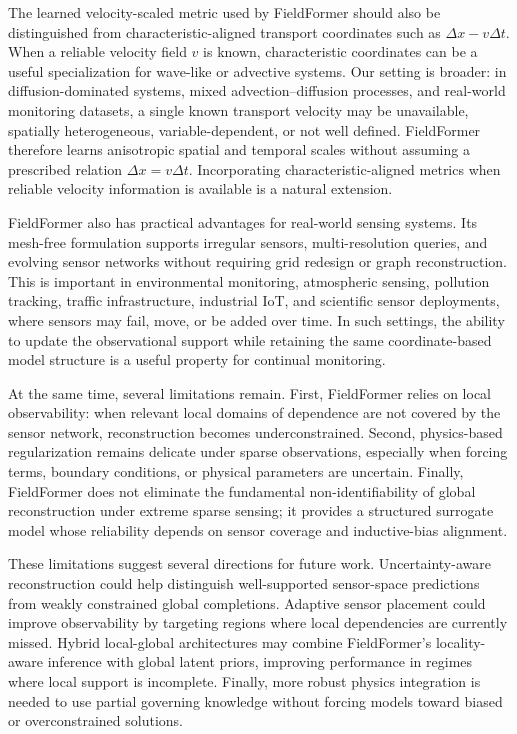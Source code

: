 The learned velocity-scaled metric used by FieldFormer should also be distinguished from characteristic-aligned transport coordinates such as $\Delta x - v\Delta t$. When a reliable velocity field $v$ is known, characteristic coordinates can be a useful specialization for wave-like or advective systems. Our setting is broader: in diffusion-dominated systems, mixed advection--diffusion processes, and real-world monitoring datasets, a single known transport velocity may be unavailable, spatially heterogeneous, variable-dependent, or not well defined. FieldFormer therefore learns anisotropic spatial and temporal scales without assuming a prescribed relation $\Delta x = v\Delta t$. Incorporating characteristic-aligned metrics when reliable velocity information is available is a natural extension.

FieldFormer also has practical advantages for real-world sensing systems. Its mesh-free formulation supports irregular sensors, multi-resolution queries, and evolving sensor networks without requiring grid redesign or graph reconstruction. This is important in environmental monitoring, atmospheric sensing, pollution tracking, traffic infrastructure, industrial IoT, and scientific sensor deployments, where sensors may fail, move, or be added over time. In such settings, the ability to update the observational support while retaining the same coordinate-based model structure is a useful property for continual monitoring.

At the same time, several limitations remain. First, FieldFormer relies on local observability: when relevant local domains of dependence are not covered by the sensor network, reconstruction becomes underconstrained. Second, physics-based regularization remains delicate under sparse observations, especially when forcing terms, boundary conditions, or physical parameters are uncertain. Finally, FieldFormer does not eliminate the fundamental non-identifiability of global reconstruction under extreme sparse sensing; it provides a structured surrogate model whose reliability depends on sensor coverage and inductive-bias alignment.

These limitations suggest several directions for future work. Uncertainty-aware reconstruction could help distinguish well-supported sensor-space predictions from weakly constrained global completions. Adaptive sensor placement could improve observability by targeting regions where local dependencies are currently missed. Hybrid local-global architectures may combine FieldFormer's locality-aware inference with global latent priors, improving performance in regimes where local support is incomplete. Finally, more robust physics integration is needed to use partial governing knowledge without forcing models toward biased or overconstrained solutions.

